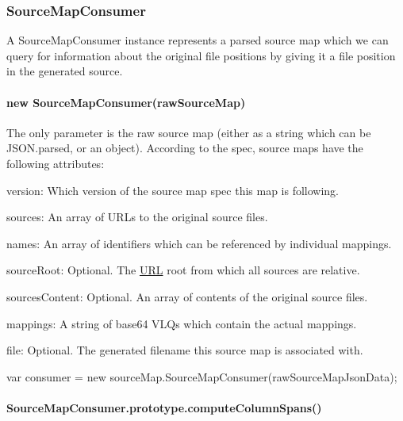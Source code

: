 \subsubsection*{Source\+Map\+Consumer}

A Source\+Map\+Consumer instance represents a parsed source map which we can query for information about the original file positions by giving it a file position in the generated source.

\paragraph*{new Source\+Map\+Consumer(raw\+Source\+Map)}

The only parameter is the raw source map (either as a string which can be {\ttfamily J\+S\+O\+N.\+parse}\textquotesingle{}d, or an object). According to the spec, source maps have the following attributes\+:


\begin{DoxyItemize}
\item {\ttfamily version}\+: Which version of the source map spec this map is following.
\item {\ttfamily sources}\+: An array of U\+R\+Ls to the original source files.
\item {\ttfamily names}\+: An array of identifiers which can be referenced by individual mappings.
\item {\ttfamily source\+Root}\+: Optional. The \mbox{\hyperlink{namespace_u_r_l}{U\+RL}} root from which all sources are relative.
\item {\ttfamily sources\+Content}\+: Optional. An array of contents of the original source files.
\item {\ttfamily mappings}\+: A string of base64 V\+L\+Qs which contain the actual mappings.
\item {\ttfamily file}\+: Optional. The generated filename this source map is associated with.
\end{DoxyItemize}


\begin{DoxyCode}
var consumer = new sourceMap.SourceMapConsumer(rawSourceMapJsonData);
\end{DoxyCode}


\paragraph*{Source\+Map\+Consumer.\+prototype.\+compute\+Column\+Spans()}


